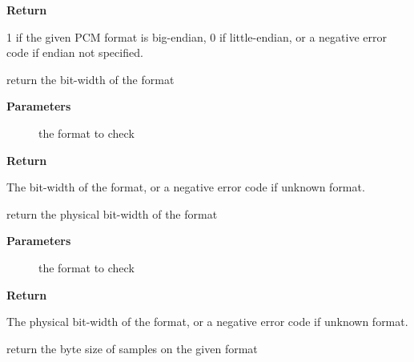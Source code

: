 \documentclass[a4paper,8pt,english]{sphinxmanual}
\begin{document}
\textbf{Return}

1 if the given PCM format is big-endian, 0 if
little-endian, or a negative error code if endian not specified.

\begin{fulllineitems}
\label{sound/kernel-api/alsa-driver-api:c.snd_pcm_format_width}
return the bit-width of the format

\end{fulllineitems}


\textbf{Parameters}
\begin{description}
\item[{}] \leavevmode
the format to check

\end{description}

\textbf{Return}

The bit-width of the format, or a negative error code
if unknown format.

\begin{fulllineitems}
\label{sound/kernel-api/alsa-driver-api:c.snd_pcm_format_physical_width}
return the physical bit-width of the format

\end{fulllineitems}


\textbf{Parameters}
\begin{description}
\item[{}] \leavevmode
the format to check

\end{description}

\textbf{Return}

The physical bit-width of the format, or a negative error code
if unknown format.

\begin{fulllineitems}
\label{sound/kernel-api/alsa-driver-api:c.snd_pcm_format_size}
return the byte size of samples on the given format

\end{fulllineitems}
\end{document}
